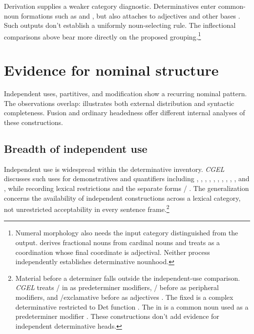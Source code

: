 \documentclass[12pt]{article}
\begin{document}
Derivation supplies a weaker category diagnostic. Determinatives enter common-noun formations such as  and , but  also attaches to adjectives and other bases \citep[Ch.~19, §5.7.2(i)]{huddleston2002}. Such outputs don't establish a uniformly noun-selecting rule. The inflectional comparisons above bear more directly on the proposed grouping.\footnote{Numeral morphology also needs the input category distinguished from the output. \textcite[§§5.4--5.5]{reynolds2026numerals} derives fractional nouns from cardinal nouns and treats  as a coordination whose final coordinate is adjectival. Neither process independently establishes determinative nounhood.}

\section{Evidence for nominal structure}\label{sec:evidence}

Independent uses, partitives, and modification show a recurring nominal pattern. The observations overlap:  illustrates both external distribution and syntactic completeness. Fusion and ordinary headedness offer different internal analyses of these constructions.

\subsection{Breadth of independent use}\label{sec:independent}

Independent use is widespread within the determinative inventory. \textit{CGEL} discusses such uses for demonstratives and quantifiers including , , , , , , , , , , and , while recording lexical restrictions and the separate forms / \citep[371--372, 410--424]{huddleston2002}. The generalization concerns the availability of independent constructions across a lexical category, not unrestricted acceptability in every sentence frame.\footnote{Material before a determiner falls outside the independent-use comparison. \textit{CGEL} treats / in  as predeterminer modifiers, / before  as peripheral modifiers, and /exclamative  before  as adjectives \citep[433--437]{huddleston2002}. The fixed  is a complex determinative restricted to Det function \citep[394]{huddleston2002}. The  in  is a common noun used as a predeterminer modifier \citep[434]{huddleston2002}. These constructions don't add evidence for independent determinative heads.}
\end{document}
